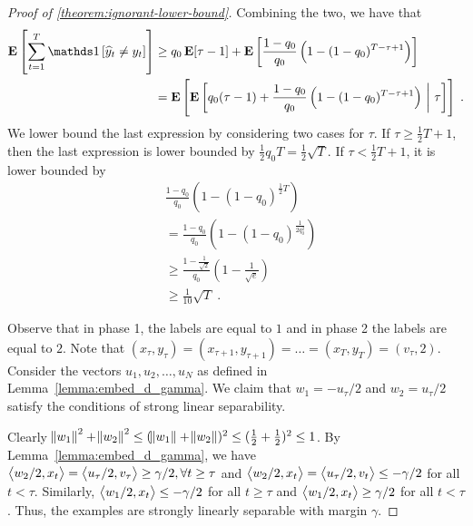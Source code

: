 \begin{proof}[Proof of \autoref{theorem:ignorant-lower-bound}]
Combining the two, we have that
\begin{align*}
 \Exp \left[\sum_{t=1}^T \indicator{\widehat y_t\neq y_t}\right]
& \ge q_0 \Exp[\tau - 1] + \Exp \left[\frac{1-q_0}{q_0}\left(1-(1-q_0)^{T-\tau+1}\right)\right] \\
& =  \Exp \left[ \Exp \left[ q_0 (\tau - 1) + \frac{1-q_0}{q_0}\left(1-(1-q_0)^{T-\tau+1}\right) ~\middle|~ \tau \right] \right] \; .
\end{align*}
We lower bound the last expression by considering two cases for $\tau$.
If $\tau \ge \frac{1}{2}T + 1$, then the last expression is lower bounded by
$\frac{1}{2}q_0 T = \frac{1}{2} \sqrt{T}$. If
$\tau < \frac{1}{2}T+1$, it is lower bounded by
\begin{align*}
& \frac{1-q_0}{q_0}\left(1-(1-q_0)^{\frac{1}{2}T}\right) \\
& = \frac{1-q_0}{q_0}\left(1-(1-q_0)^{\frac{1}{2q_0^2}}\right) \\
& \ge \frac{1-\frac{1}{\sqrt{2}}}{q_0}\left(1-\frac{1}{\sqrt{e}}\right) \\
& \ge \frac{1}{10} \sqrt{T} \; .
\end{align*}

Observe that in phase 1, the labels are equal to $1$ and in phase 2 the labels
are equal to $2$. Note that $(x_\tau, y_\tau)=(x_{\tau+1}, y_{\tau+1})= \dots =
(x_T, y_T) = (v_\tau, 2)$. Consider the vectors $u_1, u_2, \dots, u_N$ as
defined in Lemma~\ref{lemma:embed_d_gamma}. We claim that $w_1=-u_\tau/2$ and
$w_2=u_\tau/2$ satisfy the conditions of strong linear separability.

Clearly $\norm{w_1}^2 + \norm{w_2}^2 \le (\norm{w_1} + \norm{w_2})^2 \le
(\frac{1}{2} + \frac{1}{2})^2 \le 1$. By Lemma~\ref{lemma:embed_d_gamma}, we
have $\left\langle w_2/2, x_t \right\rangle = \left\langle u_\tau/2, v_\tau \right\rangle \ge \gamma/2, \forall t \ge \tau$ and
$\left\langle w_2/2, x_t \right\rangle = \left\langle u_\tau/2, v_t \right\rangle \le - \gamma/2$ for all $t < \tau$. Similarly,
$\left\langle w_1/2, x_t \right\rangle \le -\gamma/2$ for all $t \ge \tau$ and $\left\langle w_1/2, x_t \right\rangle \ge
\gamma/2$ for all $t < \tau$. Thus, the examples are strongly linearly
separable with margin $\gamma$.
\end{proof}


